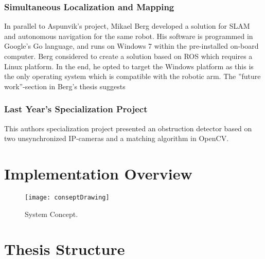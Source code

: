 \subsubsection{Simultaneous Localization and Mapping}

In parallel to Aspunvik's project, Mikael Berg developed a solution for \ac{SLAM} and autonomous navigation for the same robot\cite{berg}. His software is programmed in Google's Go language, and runs on Windows 7 within the pre-installed on-board computer. Berg considered to create a solution based on \ac{ROS} which requires a Linux platform. In the end, he opted to target the Windows platform as this is the only operating system which is compatible with the robotic arm. The ''future work''-section in Berg's thesis suggests 

\subsubsection{Last Year's Specialization Project}

This authors specialization project\cite{lindrup} presented an obstruction detector based on two unsynchronized IP-cameras and a matching algorithm in \ac{OpenCV}. 

\section{Implementation Overview}

\begin{figure}[p]
	\centering
	\texttt{[image: conseptDrawing]}
	\caption{System Concept. }
	\label{fig:conseptDrawing}
\end{figure}

\section{Thesis Structure}